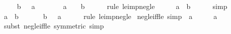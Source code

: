\begin{isabellebody}
%
\isadelimproof
%
\endisadelimproof
%
\isatagproof
{}\isamarkupfalse%
\isanewline
\ \ \isamarkupfalse%
\ {\isachardoublequoteopen}{\isacharminus}{\kern0pt}\ b\ {\isasymle}\ {\isacharminus}{\kern0pt}\ a{\isachardoublequoteclose}\isanewline
\ \ \isamarkupfalse%
\ \isamarkupfalse%
\ {\isachardoublequoteopen}{\isacharminus}{\kern0pt}\ {\isacharparenleft}{\kern0pt}{\isacharminus}{\kern0pt}\ a{\isacharparenright}{\kern0pt}\ {\isasymle}\ {\isacharminus}{\kern0pt}\ {\isacharparenleft}{\kern0pt}{\isacharminus}{\kern0pt}\ b{\isacharparenright}{\kern0pt}{\isachardoublequoteclose}\isanewline
\ \ \ \ \isamarkupfalse%
\ {\isacharparenleft}{\kern0pt}rule\ le{\isacharunderscore}{\kern0pt}imp{\isacharunderscore}{\kern0pt}neg{\isacharunderscore}{\kern0pt}le{\isacharparenright}{\kern0pt}\isanewline
\ \ \isamarkupfalse%
\ \isamarkupfalse%
\ {\isachardoublequoteopen}a\ {\isasymle}\ b{\isachardoublequoteclose}\isanewline
\ \ \ \ \isamarkupfalse%
\ simp\isanewline
{}\isamarkupfalse%
\isanewline
\ \ \isamarkupfalse%
\ {\isachardoublequoteopen}a\ {\isasymle}\ b{\isachardoublequoteclose}\isanewline
\ \ \isamarkupfalse%
\ \isamarkupfalse%
\ {\isachardoublequoteopen}{\isacharminus}{\kern0pt}\ b\ {\isasymle}\ {\isacharminus}{\kern0pt}\ a{\isachardoublequoteclose}\isanewline
\ \ \ \ \isamarkupfalse%
\ {\isacharparenleft}{\kern0pt}rule\ le{\isacharunderscore}{\kern0pt}imp{\isacharunderscore}{\kern0pt}neg{\isacharunderscore}{\kern0pt}le{\isacharparenright}{\kern0pt}\isanewline
{}\isamarkupfalse%
%
\endisatagproof
{\isafoldproof}%
%
\isadelimproof
\isanewline
%
\endisadelimproof
\isanewline
{}\isamarkupfalse%
\ neg{\isacharunderscore}{\kern0pt}le{\isacharunderscore}{\kern0pt}{}{\isacharunderscore}{\kern0pt}iff{\isacharunderscore}{\kern0pt}le\ {\isacharbrackleft}{\kern0pt}simp{\isacharbrackright}{\kern0pt}{\isacharcolon}{\kern0pt}\ {\isachardoublequoteopen}{\isacharminus}{\kern0pt}\ a\ {\isasymle}\ {}\ {\isasymlongleftrightarrow}\ {}\ {\isasymle}\ a{\isachardoublequoteclose}\isanewline
%
\isadelimproof
\ \ %
\endisadelimproof
%
\isatagproof
{}\isamarkupfalse%
\ {\isacharparenleft}{\kern0pt}subst\ neg{\isacharunderscore}{\kern0pt}le{\isacharunderscore}{\kern0pt}iff{\isacharunderscore}{\kern0pt}le\ {\isacharbrackleft}{\kern0pt}symmetric{\isacharbrackright}{\kern0pt}{\isacharparenright}{\kern0pt}\ simp%

\end{isabellebody}
